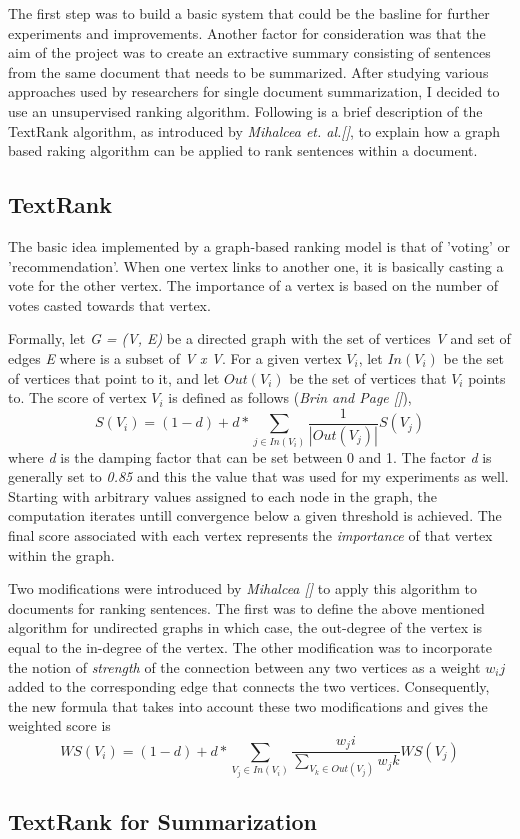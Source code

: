 The first step was to build a basic system that could be the basline for further experiments and improvements.
Another factor for consideration was that the aim of the project was to create an extractive summary consisting of sentences from the same document that needs to be summarized.
After studying various approaches used by researchers for single document summarization, I decided to use an unsupervised ranking algorithm.
Following is a brief description of the TextRank algorithm, as introduced by \emph{Mihalcea et. al.[]}, to explain how a graph based raking algorithm can be applied to rank sentences within a document.

\subsection*{TextRank}
The basic idea implemented by a graph-based ranking model is that of 'voting' or 'recommendation'.
When one vertex links to another one, it is basically casting a vote for the other vertex.
The importance of a vertex is based on the number of votes casted towards that vertex. 

Formally, let \emph{G = (V, E)} be a directed graph with the set of vertices \emph{V} and set of edges \emph{E} where is a subset of \emph{{V x V}}.
For a given vertex \(V_i\), let \(In(V_i)\) be the set of vertices that point to it, and let \(Out(V_i)\) be the set of vertices that \(V_i\) points to.
The score of vertex \(V_i\) is defined as follows (\emph{Brin and Page []}),
\[S(V_i) = (1 - d) + d * \sum_{j \in In(V_i)} \frac{1}{|Out(V_j)|}S(V_j)\]
where \emph{d} is the damping factor that can be set between 0 and 1.
The factor \emph{d} is generally set to \emph{0.85} and this the value that was used for my experiments as well.
Starting with arbitrary values assigned to each node in the graph, the computation iterates untill convergence below a given threshold is achieved.
The final score associated with each vertex represents the \textit{importance} of that vertex within the graph.

Two modifications were introduced by \emph{Mihalcea []} to apply this algorithm to documents for ranking sentences.
The first was to define the above mentioned algorithm for undirected graphs in which case, the out-degree of the vertex is equal to the in-degree of the vertex.
The other modification was to incorporate the notion of \textit{strength} of the connection between any two vertices as a weight \(w_ij\) added to the corresponding edge that connects the two vertices.
Consequently, the new formula that takes into account these two modifications and gives the weighted score is
\[WS(V_i) = (1 - d) + d * \sum_{V_j \in In(V_i)} \frac{w_ji}{\sum_{V_k \in Out(V_j)}w_jk}WS(V_j)\]

\subsection*{TextRank for Summarization}
